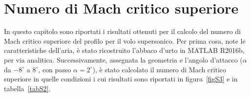 
\section{Numero di Mach critico superiore \Msup}
In questo capitolo sono riportati i risultati ottenuti per il calcolo del numero di Mach critico superiore \Msup del profilo per il volo supersonico. Per prima cosa, note le caratteristiche dell'aria, è stato ricostruito l'abbaco d'urto in MATLAB R2016b, per via analitica. %
Successivamente, assegnata la geometria e l'angolo d'attacco ($\alpha$ da $-8^{\circ}$ a $8^{\circ}$, con passo $\alpha=2^{\circ}$), è stato calcolato il numero di Mach critico superiore in quelle condizioni i cui risultati sono riportati in figura~\vref{figS3} e in tabella~\vref{tabS2}.

